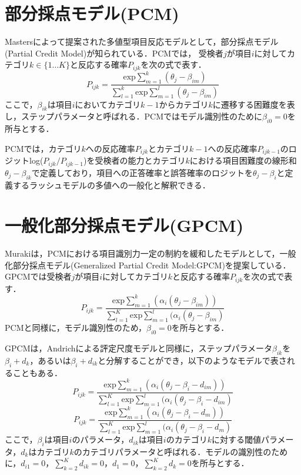 \documentclass[a4paper,11pt,oneside,openany]{jsbook}
\begin{document}
\section{部分採点モデル(PCM)}
Mastersによって提案された多値型項目反応モデルとして，部分採点モデル(Partial Credit Model)\cite{PCM}が知られている．PCMでは， 受検者$j$が項目$i$に対してカテゴリ$k \in \{1\dots K\}$と反応する確率$P_{ijk}$を次の式で表す．
\begin{displaymath}
P_{ijk} = \frac{\mathrm{exp}\sum_{m=1}^{k}(\theta_{j}-\beta_{im})}{\sum_{l=1}^{k} \mathrm{exp}\sum_{m=1}^{l}(\theta_{j}-\beta_{im})}
\end{displaymath}
ここで，$\beta_{ik}$は項目$i$においてカテゴリ$k-1$からカテゴリ$k$に遷移する困難度を表し，ステップパラメータと呼ばれる．PCMではモデル識別性のために$\beta_{i0}=0$を所与とする．

PCMでは，カテゴリ$k$への反応確率$P_{ijk}$とカテゴリ$k-1$への反応確率$P_{ijk-1}$のロジットlog($P_{ijk}/P_{ijk-1}$)を受検者の能力とカテゴリ$k$における項目困難度の線形和$\theta_{j}-\beta_{ik}$で定義しており，項目への正答確率と誤答確率のロジットを$\theta_{j}-\beta_{i}$と定義するラッシュモデルの多値への一般化と解釈できる．

\section{一般化部分採点モデル(GPCM)}
Murakiは，PCMにおける項目識別力一定の制約を緩和したモデルとして，一般化部分採点モデル(Generalized Partial Credit Model:GPCM)\cite{GPCM}を提案している．GPCMでは受検者$j$が項目$i$に対してカテゴリ$k$と反応する確率$P_{ijk}$を次の式で表す．
\begin{displaymath}
P_{ijk} = \frac{\mathrm{exp}\sum_{m=1}^{k}(\alpha_{i}(\theta_{j}-\beta_{im}))}{\sum_{l=1}^{K} \mathrm{exp}\sum_{m=1}^{l}(\alpha_{i}(\theta_{j}-\beta_{im})}
\end{displaymath}
PCMと同様に，モデル識別性のため，$\beta_{i0}=0$を所与とする．

GPCMは，Andrichによる評定尺度モデル\cite{RSM}と同様に，ステップパラメータ$\beta_{ik}$を$\beta_{i}+d_{k}$，あるいは$\beta_{i}+d_{ik}$と分解することができ，以下のようなモデルで表されることもある．
\begin{displaymath}
P_{ijk} = \frac{\mathrm{exp}\sum_{m=1}^{k}(\alpha_{i}(\theta_{j}-\beta_{i}-d_{im}))}{\sum_{l=1}^{K} \mathrm{exp}\sum_{m=1}^{l}(\alpha_{i}(\theta_{j}-\beta_{i}-d_{im})}
\end{displaymath}
\begin{displaymath}
P_{ijk} = \frac{\mathrm{exp}\sum_{m=1}^{k}(\alpha_{i}(\theta_{j}-\beta_{i}-d_{m}))}{\sum_{l=1}^{K} \mathrm{exp}\sum_{m=1}^{l}(\alpha_{i}(\theta_{j}-\beta_{i}-d_{m})}
\end{displaymath}
ここで，$\beta_{i}$は項目$i$のパラメータ，$d_{ik}$は項目$i$のカテゴリ$k$に対する閾値パラメータ，$d_k$はカテゴリ$k$のカテゴリパラメータと呼ばれる．モデルの識別性のために，$d_{i1}=0，\sum_{k=2}^{K}d_{ik}=0，d_1=0，\sum_{k=2}^{K}d_{k}=0$を所与とする．
\end{document}

